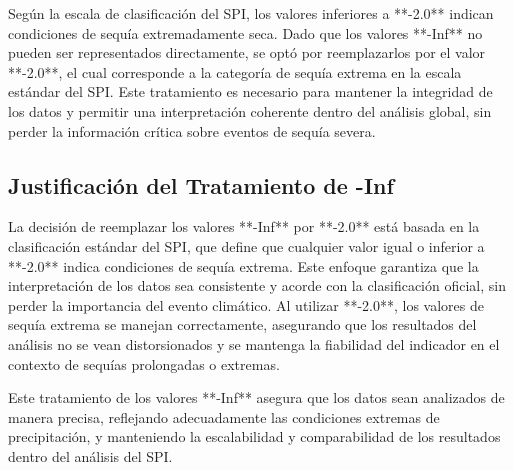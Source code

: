 Según la escala de clasificación del SPI, los valores inferiores a **-2.0** indican condiciones de sequía extremadamente seca. Dado que los valores **-Inf** no pueden ser representados directamente, se optó por reemplazarlos por el valor **-2.0**, el cual corresponde a la categoría de sequía extrema en la escala estándar del SPI. Este tratamiento es necesario para mantener la integridad de los datos y permitir una interpretación coherente dentro del análisis global, sin perder la información crítica sobre eventos de sequía severa.

\subsection{Justificación del Tratamiento de -Inf}

La decisión de reemplazar los valores **-Inf** por **-2.0** está basada en la clasificación estándar del SPI, que define que cualquier valor igual o inferior a **-2.0** indica condiciones de sequía extrema. Este enfoque garantiza que la interpretación de los datos sea consistente y acorde con la clasificación oficial, sin perder la importancia del evento climático. Al utilizar **-2.0**, los valores de sequía extrema se manejan correctamente, asegurando que los resultados del análisis no se vean distorsionados y se mantenga la fiabilidad del indicador en el contexto de sequías prolongadas o extremas.

Este tratamiento de los valores **-Inf** asegura que los datos sean analizados de manera precisa, reflejando adecuadamente las condiciones extremas de precipitación, y manteniendo la escalabilidad y comparabilidad de los resultados dentro del análisis del SPI.


